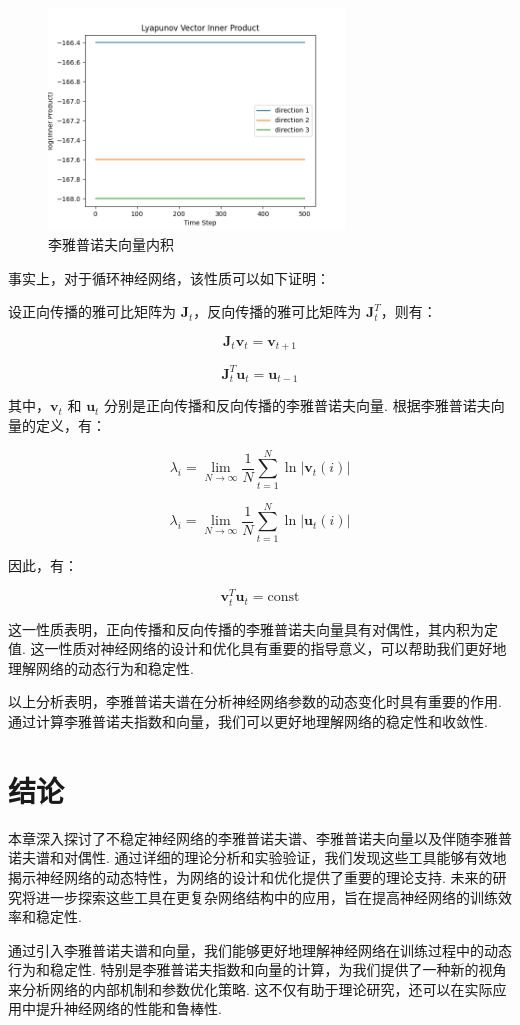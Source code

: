 \begin{figure}[htbp]
   \centering
   \includegraphics[width=0.7\textwidth]{figures/inner_product.png}
   \caption{李雅普诺夫向量内积}
   \label{fig:example}
 \end{figure}

事实上，对于循环神经网络，该性质可以如下证明：

设正向传播的雅可比矩阵为 \(\mathbf{J}_t\)，反向传播的雅可比矩阵为 \(\mathbf{J}_t^T\)，则有：

\[
\mathbf{J}_t \mathbf{v}_t = \mathbf{v}_{t+1}
\]

\[
\mathbf{J}_t^T \mathbf{u}_t = \mathbf{u}_{t-1}
\]

其中，\(\mathbf{v}_t\) 和 \(\mathbf{u}_t\) 分别是正向传播和反向传播的李雅普诺夫向量. 根据李雅普诺夫向量的定义，有：

\[
\lambda_i = \lim_{N \to \infty} \frac{1}{N} \sum_{t=1}^N \ln |\mathbf{v}_t(i)|
\]

\[
\lambda_i = \lim_{N \to \infty} \frac{1}{N} \sum_{t=1}^N \ln |\mathbf{u}_t(i)|
\]

因此，有：

\[
\mathbf{v}_t^T \mathbf{u}_t = \text{const}
\]

这一性质表明，正向传播和反向传播的李雅普诺夫向量具有对偶性，其内积为定值. 这一性质对神经网络的设计和优化具有重要的指导意义，可以帮助我们更好地理解网络的动态行为和稳定性. 

以上分析表明，李雅普诺夫谱在分析神经网络参数的动态变化时具有重要的作用. 通过计算李雅普诺夫指数和向量，我们可以更好地理解网络的稳定性和收敛性. 

\section{结论}

本章深入探讨了不稳定神经网络的李雅普诺夫谱、李雅普诺夫向量以及伴随李雅普诺夫谱和对偶性. 通过详细的理论分析和实验验证，我们发现这些工具能够有效地揭示神经网络的动态特性，为网络的设计和优化提供了重要的理论支持. 未来的研究将进一步探索这些工具在更复杂网络结构中的应用，旨在提高神经网络的训练效率和稳定性. 

通过引入李雅普诺夫谱和向量，我们能够更好地理解神经网络在训练过程中的动态行为和稳定性. 特别是李雅普诺夫指数和向量的计算，为我们提供了一种新的视角来分析网络的内部机制和参数优化策略. 这不仅有助于理论研究，还可以在实际应用中提升神经网络的性能和鲁棒性. 
